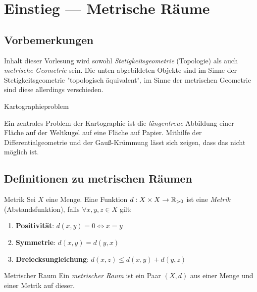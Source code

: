 \chapter{Einstieg --- Metrische Räume}

\section{Vorbemerkungen}

Inhalt dieser Vorlesung wird sowohl \emph{Stetigkeitsgeometrie} (Topologie) als auch \emph{metrische Geometrie} sein. Die unten abgebildeten Objekte sind im Sinne der Stetigkeitsgeometrie "topologisch äquivalent", im Sinne der metrischen Geometrie sind diese allerdings verschieden.


\begin{bla}{Kartographieproblem}
  \begin{marginfigure}
  \end{marginfigure}
  Ein zentrales Problem der Kartographie ist die \emph{längentreue} Abbildung einer Fläche auf der Weltkugel auf eine Fläche auf Papier. Mithilfe der Differentialgeometrie und der Gauß-Krümmung lässt sich zeigen, dass das nicht möglich ist.
\end{bla}

\section{Definitionen zu metrischen Räumen}

\begin{definition}{Metrik}
  Sei $ X $ eine Menge. Eine Funktion $ d: X \times X \to \mathbb{R}_{>0} $ ist eine \emph{Metrik} (Abstandsfunktion), falls $ \forall x, y, z \in X $ gilt:
  \begin{enumerate}
    \item \textbf{Positivität}: $ d(x, y) = 0 \Leftrightarrow x = y $ 
    \item \textbf{Symmetrie}: $ d(x,y) = d(y,x) $
    \item \textbf{Dreiecksungleichung}: $ d(x,z) \leq d(x,y) + d(y,z) $
  \end{enumerate}
\end{definition}

\begin{definition}{Metrischer Raum}
  Ein \emph{metrischer Raum} ist ein Paar $ (X,d) $ aus einer Menge und einer Metrik auf dieser.
\end{definition}

